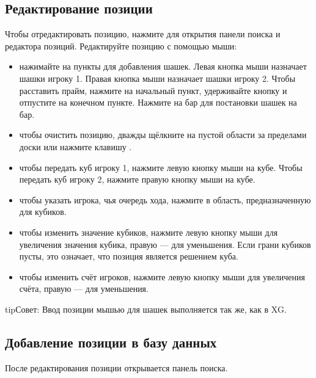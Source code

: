 \documentclass[letterpaper,10pt,russian]{sphinxmanual}
\begin{document}
\subsection{Редактирование позиции}
\label{\detokenize{guide_utilisateur:editer-une-position}}\label{\detokenize{guide_utilisateur:guide-edit-position}}
\sphinxAtStartPar
Чтобы отредактировать позицию, нажмите  для открытия панели поиска и редактора позиций. Редактируйте позицию с помощью мыши:
\begin{itemize}
\item {} 
\sphinxAtStartPar
нажимайте на пункты для добавления шашек. Левая кнопка мыши назначает шашки игроку 1. Правая кнопка мыши назначает шашки игроку 2. Чтобы расставить прайм, нажмите на начальный пункт, удерживайте кнопку и отпустите на конечном пункте. Нажмите на бар для постановки шашек на бар.

\item {} 
\sphinxAtStartPar
чтобы очистить позицию, дважды щёлкните на пустой области за пределами доски или нажмите клавишу .

\item {} 
\sphinxAtStartPar
чтобы передать куб игроку 1, нажмите левую кнопку мыши на кубе. Чтобы передать куб игроку 2, нажмите правую кнопку мыши на кубе.

\item {} 
\sphinxAtStartPar
чтобы указать игрока, чья очередь хода, нажмите в область, предназначенную для кубиков.

\item {} 
\sphinxAtStartPar
чтобы изменить значение кубиков, нажмите левую кнопку мыши для увеличения значения кубика, правую — для уменьшения. Если грани кубиков пусты, это означает, что позиция является решением куба.

\item {} 
\sphinxAtStartPar
чтобы изменить счёт игроков, нажмите левую кнопку мыши для увеличения счёта, правую — для уменьшения.

\end{itemize}

\begin{sphinxadmonition}{tip}{Совет:}
\sphinxAtStartPar
Ввод позиции мышью для шашек выполняется так же, как в XG.
\end{sphinxadmonition}


\subsection{Добавление позиции в базу данных}
\label{\detokenize{guide_utilisateur:ajouter-une-position-a-la-base-de-donnees}}
\sphinxAtStartPar
После редактирования позиции открывается панель поиска.
\end{document}
